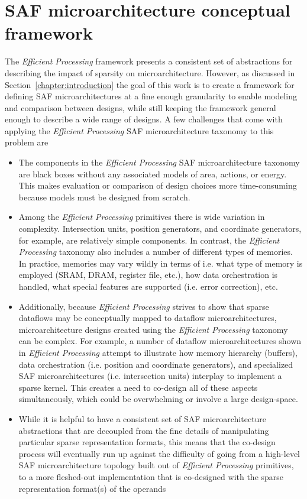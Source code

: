 \chapter{SAF microarchitecture conceptual framework}
\label{chapter:conceptual_framework}

The \textit{Efficient Processing} framework presents a consistent set of abstractions for describing the impact of sparsity on microarchitecture. However, as discussed in Section~\ref{chapter:introduction} the goal of this work is to create a framework for defining SAF microarchitectures at a fine enough granularity to enable modeling and comparison between designs, while still keeping the framework general enough to describe a wide range of designs. A few challenges that come with applying the \textit{Efficient Processing} SAF microarchitecture taxonomy to this problem are

\begin{itemize}
    \item The components in the \textit{Efficient Processing} SAF microarchitecture taxonomy are black boxes without any associated models of area, actions, or energy. This makes evaluation or comparison of design choices more time-consuming because models must be designed from scratch.
    \item Among the \textit{Efficient Processing} primitives there is wide variation in complexity. Intersection units, position generators, and coordinate generators, for example, are relatively simple components. In contrast, the \textit{Efficient Processing} taxonomy also includes a number of different types of memories. In practice, memories may vary wildly in terms of i.e. what type of memory is employed (SRAM, DRAM, register file, etc.), how data orchestration is handled, what special features are supported (i.e. error correction), etc. 
    \item Additionally, because \textit{Efficient Processing} strives to show that sparse dataflows may be conceptually mapped to dataflow microarchitectures\cite{szebook}, microarchitecture designs created using the \textit{Efficient Processing} taxonomy can be complex. For example, a number of dataflow microarchitectures shown in \textit{Efficient Processing} attempt to illustrate how memory hierarchy (buffers), data orchestration (i.e. position and coordinate generators), and specialized SAF microarchitectures (i.e. intersection units) interplay to implement a sparse kernel\cite{szebook}. This creates a need to co-design all of these aspects simultaneously, which could be overwhelming or involve a large design-space.
    
    \item While it is helpful to have a consistent set of SAF microarchitecture abstractions that are decoupled from the fine details of manipulating particular sparse representation formats, this means that the co-design process will eventually run up against the difficulty of going from a high-level SAF microarchitecture topology built out of \textit{Efficient Processing} primitives, to a more fleshed-out implementation that is co-designed with the sparse representation format(s) of the operands
    
\end{itemize}

